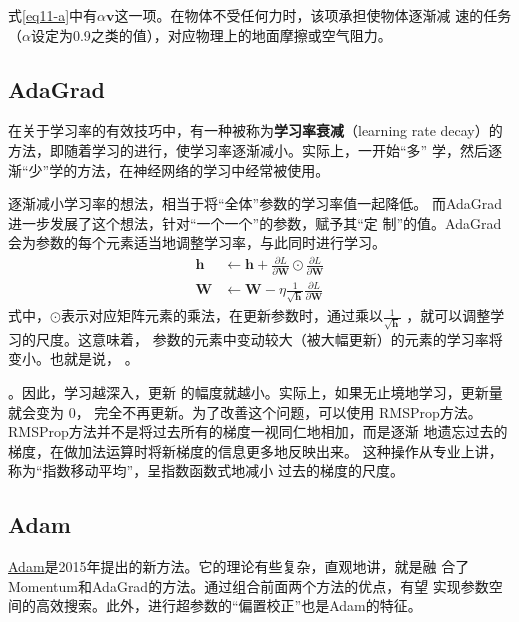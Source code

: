 式\autoref{eq11-a}中有$\alpha \bm{v}$这一项。在物体不受任何力时，该项承担使物体逐渐减
速的任务（$\alpha$设定为0.9之类的值），对应物理上的地面摩擦或空气阻力。
\subsection{AdaGrad}
在关于学习率的有效技巧中，有一种被称为\textbf{学习率衰减}（learning rate
decay）的方法，即随着学习的进行，使学习率逐渐减小。实际上，一开始“多”
学，然后逐渐“少”学的方法，在神经网络的学习中经常被使用。

逐渐减小学习率的想法，相当于将“全体”参数的学习率值一起降低。
而AdaGrad进一步发展了这个想法，针对“一个一个”的参数，赋予其“定
制”的值。AdaGrad会为参数的每个元素适当地调整学习率，与此同时进行学习。
\begin{subequations}
    \begin{align}
        \bm{h} & \leftarrow  \bm{h} + \frac{\partial L}{\partial \bm{W}} \odot \frac{\partial L}{\partial \bm{W}} \label{eq12-a} \\
        \bm{W} & \leftarrow \bm{W} -\eta \frac{1}{\sqrt{\bm{h}}}\frac{\partial L}{\partial \bm{W}} \label{eq12-b}
    \end{align}
\end{subequations}
式中，$\odot$表示对应矩阵元素的乘法，在更新参数时，通过乘以$\frac{1}{\sqrt{\bm{h}}}$
，就可以调整学习的尺度。这意味着，
参数的元素中变动较大（被大幅更新）的元素的学习率将变小。也就是说，
。
\begin{tcolorbox}
    。因此，学习越深入，更新
    的幅度就越小。实际上，如果无止境地学习，更新量就会变为 0，
    完全不再更新。为了改善这个问题，可以使用 RMSProp方法。
    RMSProp方法并不是将过去所有的梯度一视同仁地相加，而是逐渐
    地遗忘过去的梯度，在做加法运算时将新梯度的信息更多地反映出来。
    这种操作从专业上讲，称为“指数移动平均”，呈指数函数式地减小
    过去的梯度的尺度。
\end{tcolorbox}

\subsection{Adam}
\href{https://arxiv.org/abs/1412.6980v8}{Adam}是2015年提出的新方法。它的理论有些复杂，直观地讲，就是融
合了Momentum和AdaGrad的方法。通过组合前面两个方法的优点，有望
实现参数空间的高效搜索。此外，进行超参数的“偏置校正”也是Adam的特征。

